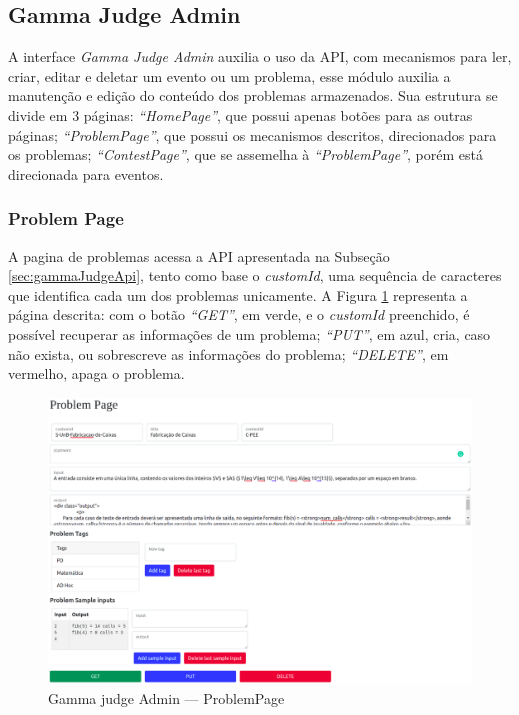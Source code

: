 \subsection{Gamma Judge Admin}
\label{sec:gamaJudgeAdmin}

A interface \textit{Gamma Judge Admin} auxilia o uso da API, com mecanismos para ler, criar, editar e deletar um evento ou um problema, esse módulo auxilia a manutenção e edição do conteúdo dos problemas armazenados. Sua estrutura se divide em 3 páginas:\textit{ “HomePage”}, que possui apenas botões para as outras páginas; \textit{``ProblemPage''}, que possui os mecanismos descritos, direcionados para os problemas; \textit{``ContestPage''}, que se assemelha à \textit{``ProblemPage''}, porém está direcionada para eventos.

\subsubsection{Problem Page}

A pagina de problemas acessa a API apresentada na Subseção \ref{sec:gammaJudgeApi}, tento como base o \textit{customId}, uma sequência de caracteres que identifica cada um dos problemas unicamente. A Figura \ref{fig:judge_admin_problem} representa a página descrita: com o botão \textit{``GET''}, em verde, e o \textit{customId} preenchido, é possível recuperar as informações de um problema; \textit{``PUT''}, em azul, cria, caso não exista, ou sobrescreve as informações do problema; \textit{``DELETE''}, em vermelho, apaga o problema.

\begin{figure}[H]
    \centering
    \includegraphics[keepaspectratio=true,scale=0.32]{figuras/problem_page.eps}
    \caption{Gamma judge Admin — ProblemPage}
    \label{fig:judge_admin_problem}
\end{figure}

